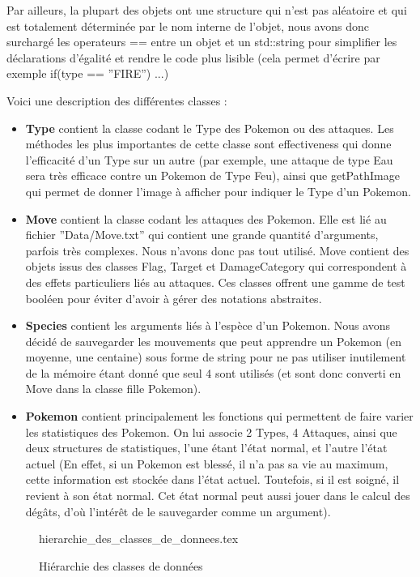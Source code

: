 \documentclass[a4paper,twoside, openany,11pt]{book}
\begin{document}
Par ailleurs, la plupart des objets ont une structure qui n'est pas aléatoire et qui est totalement déterminée par le nom interne de l'objet, nous avons donc surchargé les operateurs == entre un objet et un std::string pour simplifier les déclarations d'égalité et rendre le code plus lisible (cela permet d'écrire par exemple if(type == ''FIRE'') ...)

Voici une description des différentes classes :

\begin{itemize}
\item \textbf{Type} contient la classe codant le Type des Pokemon ou des attaques. Les méthodes les plus importantes de cette classe sont effectiveness qui donne l'efficacité d'un Type sur un autre (par exemple, une attaque de type Eau sera très efficace contre un Pokemon de Type Feu), ainsi que getPathImage qui permet de donner l'image à afficher pour indiquer le Type d'un Pokemon.
\item \textbf{Move} contient la classe codant les attaques des Pokemon. Elle est lié au fichier ''Data/Move.txt'' qui contient une grande quantité d'arguments, parfois très complexes. Nous n'avons donc pas tout utilisé. Move contient des objets issus des classes Flag, Target et DamageCategory qui correspondent à des effets particuliers liés au attaques. Ces classes offrent une gamme de test booléen pour éviter d'avoir à gérer des notations abstraites. 
\item  \textbf{Species} contient les arguments liés à l'espèce d'un Pokemon. Nous avons décidé de sauvegarder les mouvements que peut apprendre un Pokemon (en moyenne, une centaine) sous forme de string pour ne pas utiliser inutilement de la mémoire étant donné que seul 4 sont utilisés (et sont donc converti en Move dans la classe fille Pokemon). 
\item  \textbf{Pokemon} contient principalement les fonctions qui permettent de faire varier les statistiques des Pokemon. On lui associe 2 Types, 4 Attaques, ainsi que deux structures de statistiques, l'une étant l'état normal, et l'autre l'état actuel (En effet, si un Pokemon est blessé, il n'a pas sa vie au maximum, cette information est stockée dans l'état actuel. Toutefois, si il est soigné, il revient à son état normal. Cet état normal peut aussi jouer dans le calcul des dégâts, d'où l’intérêt de le sauvegarder comme un argument). 
\end{itemize}

\begin{figure}[!h]\centering
{hierarchie_des_classes_de_donnees.tex}
\caption{Hiérarchie des classes de données}
\end{figure}
\end{document}
